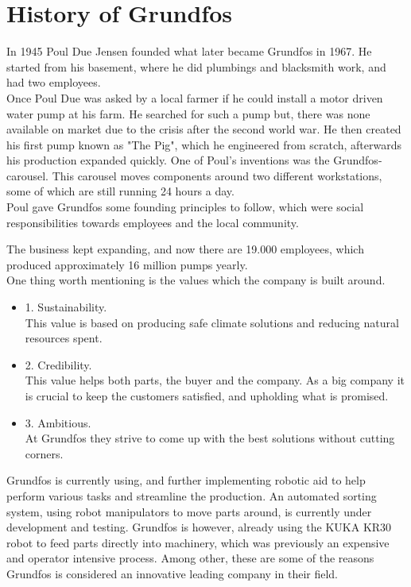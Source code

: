 \section{History of Grundfos} \label{ch:History of Grundfos}

In 1945 Poul Due Jensen founded what later became Grundfos in 1967. He started from his basement, where he did plumbings and blacksmith work, and had two employees\cite{1Grundfos}.\\

Once Poul Due was asked by a local farmer if he could install a motor driven water pump at his farm. He searched for such a pump but, there was none available on market due to the crisis after the second world war. 
He then created his first pump known as "The Pig", which he engineered from scratch, afterwards his production expanded quickly. 
One of Poul's inventions was the Grundfos-carousel. This carousel moves components around two different workstations, some of which are still running 24 hours a day.\\

Poul gave Grundfos some founding principles to follow, which were social responsibilities towards employees and the local community.

The business kept expanding, and now there are 19.000 employees, which produced approximately 16 million pumps yearly\cite{1Grundfos}.\\

One thing worth mentioning is the values which the company is built around.\\

\begin{itemize}
   
\item 1. Sustainability.\\ This value is based on producing safe climate solutions and reducing natural resources spent.\\
\item 2. Credibility.\\ This value helps both parts, the buyer and the company. As a big company it is crucial to keep the customers satisfied, and upholding what is promised.\\
\item 3. Ambitious.\\ At Grundfos they strive to come up with the best solutions without cutting corners.\\
\end{itemize}
Grundfos is currently using, and further implementing robotic aid to help perform various tasks and streamline the production. An automated sorting system, using robot manipulators to move parts around, is currently under development and testing. Grundfos is however, already using the KUKA KR30 robot to feed parts directly into machinery, which was previously an expensive and operator intensive process. Among other, these are some of the reasons Grundfos is considered an innovative leading company in their field\cite{1Grundfos}. 


